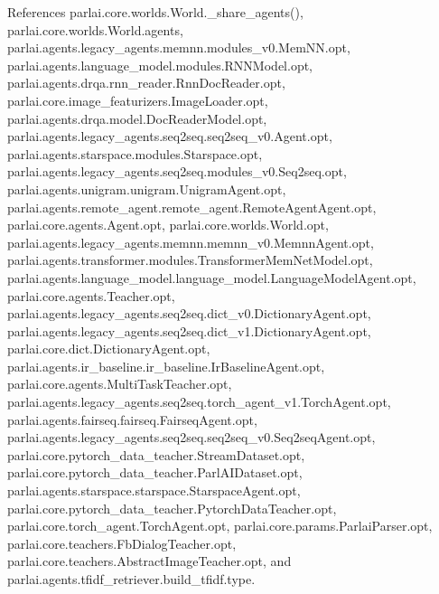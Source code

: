 References parlai.\+core.\+worlds.\+World.\+\_\+share\+\_\+agents(), parlai.\+core.\+worlds.\+World.\+agents, parlai.\+agents.\+legacy\+\_\+agents.\+memnn.\+modules\+\_\+v0.\+Mem\+N\+N.\+opt, parlai.\+agents.\+language\+\_\+model.\+modules.\+R\+N\+N\+Model.\+opt, parlai.\+agents.\+drqa.\+rnn\+\_\+reader.\+Rnn\+Doc\+Reader.\+opt, parlai.\+core.\+image\+\_\+featurizers.\+Image\+Loader.\+opt, parlai.\+agents.\+drqa.\+model.\+Doc\+Reader\+Model.\+opt, parlai.\+agents.\+legacy\+\_\+agents.\+seq2seq.\+seq2seq\+\_\+v0.\+Agent.\+opt, parlai.\+agents.\+starspace.\+modules.\+Starspace.\+opt, parlai.\+agents.\+legacy\+\_\+agents.\+seq2seq.\+modules\+\_\+v0.\+Seq2seq.\+opt, parlai.\+agents.\+unigram.\+unigram.\+Unigram\+Agent.\+opt, parlai.\+agents.\+remote\+\_\+agent.\+remote\+\_\+agent.\+Remote\+Agent\+Agent.\+opt, parlai.\+core.\+agents.\+Agent.\+opt, parlai.\+core.\+worlds.\+World.\+opt, parlai.\+agents.\+legacy\+\_\+agents.\+memnn.\+memnn\+\_\+v0.\+Memnn\+Agent.\+opt, parlai.\+agents.\+transformer.\+modules.\+Transformer\+Mem\+Net\+Model.\+opt, parlai.\+agents.\+language\+\_\+model.\+language\+\_\+model.\+Language\+Model\+Agent.\+opt, parlai.\+core.\+agents.\+Teacher.\+opt, parlai.\+agents.\+legacy\+\_\+agents.\+seq2seq.\+dict\+\_\+v0.\+Dictionary\+Agent.\+opt, parlai.\+agents.\+legacy\+\_\+agents.\+seq2seq.\+dict\+\_\+v1.\+Dictionary\+Agent.\+opt, parlai.\+core.\+dict.\+Dictionary\+Agent.\+opt, parlai.\+agents.\+ir\+\_\+baseline.\+ir\+\_\+baseline.\+Ir\+Baseline\+Agent.\+opt, parlai.\+core.\+agents.\+Multi\+Task\+Teacher.\+opt, parlai.\+agents.\+legacy\+\_\+agents.\+seq2seq.\+torch\+\_\+agent\+\_\+v1.\+Torch\+Agent.\+opt, parlai.\+agents.\+fairseq.\+fairseq.\+Fairseq\+Agent.\+opt, parlai.\+agents.\+legacy\+\_\+agents.\+seq2seq.\+seq2seq\+\_\+v0.\+Seq2seq\+Agent.\+opt, parlai.\+core.\+pytorch\+\_\+data\+\_\+teacher.\+Stream\+Dataset.\+opt, parlai.\+core.\+pytorch\+\_\+data\+\_\+teacher.\+Parl\+A\+I\+Dataset.\+opt, parlai.\+agents.\+starspace.\+starspace.\+Starspace\+Agent.\+opt, parlai.\+core.\+pytorch\+\_\+data\+\_\+teacher.\+Pytorch\+Data\+Teacher.\+opt, parlai.\+core.\+torch\+\_\+agent.\+Torch\+Agent.\+opt, parlai.\+core.\+params.\+Parlai\+Parser.\+opt, parlai.\+core.\+teachers.\+Fb\+Dialog\+Teacher.\+opt, parlai.\+core.\+teachers.\+Abstract\+Image\+Teacher.\+opt, and parlai.\+agents.\+tfidf\+\_\+retriever.\+build\+\_\+tfidf.\+type.

